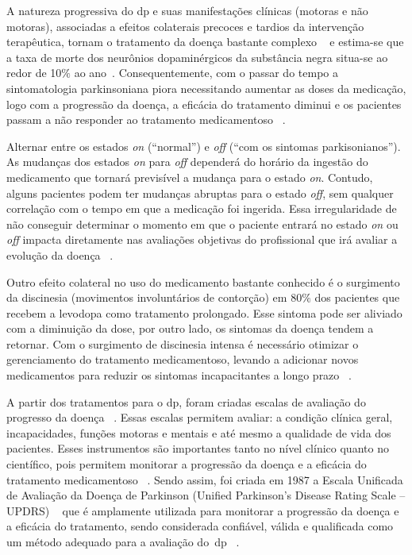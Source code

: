 A natureza progressiva do \ac{dp} e suas manifestações clínicas (motoras e não motoras),  associadas a efeitos colaterais precoces e tardios da intervenção terapêutica, tornam o tratamento da doença bastante complexo ~\cite{protpar010} e estima-se que a taxa de morte dos neurônios dopaminérgicos da substância negra situa-se  ao redor de 10$\%$ ao ano~\cite{national2006parkinson}. Consequentemente, com o passar do tempo a sintomatologia parkinsoniana piora necessitando aumentar as doses da medicação, logo com a progressão da doença, a eficácia do tratamento diminui e os pacientes passam a não responder ao tratamento medicamentoso ~\cite{protpar010}. 

Alternar entre os estados \textit{on} (``normal'') e \textit{off} (``com os sintomas parkisonianos''). As mudanças dos estados \textit{on} para \textit{off} dependerá do horário da ingestão do medicamento que tornará previsível a mudança para o estado \textit{on}. Contudo, alguns pacientes podem ter mudanças abruptas para o estado \textit{off}, sem qualquer correlação com o tempo em que a medicação foi ingerida. Essa irregularidade de não conseguir determinar o momento em que o paciente entrará no estado \textit{on} ou \textit{off} impacta diretamente nas avaliações objetivas do profissional que irá avaliar a evolução da doença ~\cite{kostek12,patel_monitoring_2009}. 

Outro efeito colateral no uso do medicamento bastante conhecido é o surgimento da discinesia (movimentos involuntários de contorção) em 80$\%$ dos pacientes que recebem a levodopa como tratamento prolongado. Esse sintoma pode ser aliviado com a diminuição da dose, por outro lado, os sintomas da doença tendem a retornar. Com o surgimento de discinesia intensa é necessário otimizar o gerenciamento do tratamento medicamentoso, levando a adicionar novos medicamentos para reduzir os sintomas incapacitantes a longo prazo ~\cite{rodrigues2006}. 

A partir dos tratamentos para o \ac{dp}, foram criadas escalas de avaliação do progresso da doença ~\cite{updrs87,Hoehn_Yahr_2001}. Essas escalas permitem avaliar: a condição clínica geral, incapacidades, funções motoras e mentais e até mesmo a qualidade de vida dos pacientes. Esses instrumentos são importantes tanto no nível clínico quanto no científico, pois permitem monitorar a progressão da doença e a eficácia do tratamento medicamentoso ~\cite{updrs87,goul05}.  Sendo assim, foi criada em 1987 a Escala Unificada de Avaliação da  Doença de Parkinson (Unified Parkinson’s Disease Rating Scale – UPDRS) ~\cite{updrs87} que é amplamente utilizada para monitorar a progressão da doença e a eficácia do tratamento, sendo considerada confiável, válida e qualificada como um método adequado para a avaliação do~\ac{dp} ~\cite{goul05}. 

